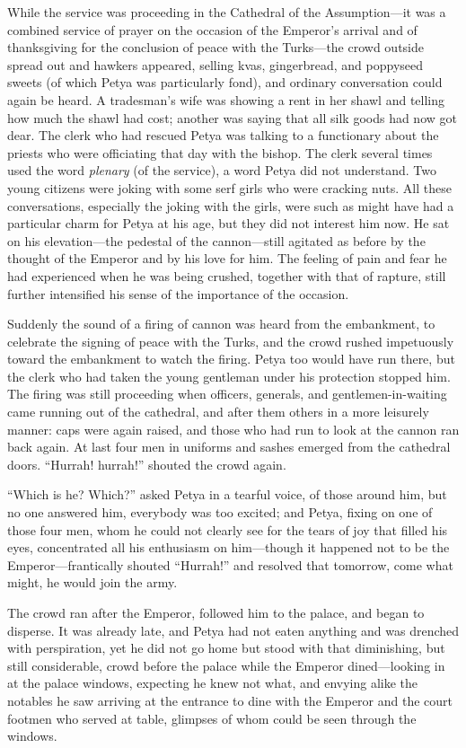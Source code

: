 While the service was proceeding in the Cathedral of the
Assumption---it was a combined service of prayer on the occasion
of the Emperor's arrival and of thanksgiving for the conclusion
of peace with the Turks---the crowd outside spread out and
hawkers appeared, selling kvas, gingerbread, and poppyseed sweets
(of which Petya was particularly fond), and ordinary conversation
could again be heard. A tradesman's wife was showing a rent in
her shawl and telling how much the shawl had cost; another was
saying that all silk goods had now got dear. The clerk who had
rescued Petya was talking to a functionary about the priests who
were officiating that day with the bishop. The clerk several
times used the word \emph{plenary} (of the service), a word Petya
did not understand.  Two young citizens were joking with some
serf girls who were cracking nuts. All these conversations,
especially the joking with the girls, were such as might have had
a particular charm for Petya at his age, but they did not
interest him now. He sat on his elevation---the pedestal of the
cannon---still agitated as before by the thought of the Emperor
and by his love for him. The feeling of pain and fear he had
experienced when he was being crushed, together with that of
rapture, still further intensified his sense of the importance of
the occasion.

Suddenly the sound of a firing of cannon was heard from the
embankment, to celebrate the signing of peace with the Turks, and
the crowd rushed impetuously toward the embankment to watch the
firing. Petya too would have run there, but the clerk who had
taken the young gentleman under his protection stopped him. The
firing was still proceeding when officers, generals, and
gentlemen-in-waiting came running out of the cathedral, and after
them others in a more leisurely manner: caps were again raised,
and those who had run to look at the cannon ran back again. At
last four men in uniforms and sashes emerged from the cathedral
doors. ``Hurrah! hurrah!'' shouted the crowd again.

``Which is he? Which?'' asked Petya in a tearful voice, of those
around him, but no one answered him, everybody was too excited;
and Petya, fixing on one of those four men, whom he could not
clearly see for the tears of joy that filled his eyes,
concentrated all his enthusiasm on him---though it happened not
to be the Emperor---frantically shouted ``Hurrah!'' and resolved
that tomorrow, come what might, he would join the army.

The crowd ran after the Emperor, followed him to the palace, and
began to disperse. It was already late, and Petya had not eaten
anything and was drenched with perspiration, yet he did not go
home but stood with that diminishing, but still considerable,
crowd before the palace while the Emperor dined---looking in at
the palace windows, expecting he knew not what, and envying alike
the notables he saw arriving at the entrance to dine with the
Emperor and the court footmen who served at table, glimpses of
whom could be seen through the windows.

